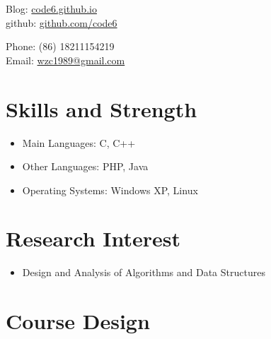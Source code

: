 \documentclass[margin,line]{res}
\newcommand{\ressection}[1]{
    {\colorbox{bg}{\fontfamily{phv}\selectfont\large#1}}
}
\begin{document}


\begin{resume}

 \hspace{-1cm}
\begin{minipage}{1\linewidth}
  \begin{minipage}{0.49\linewidth}
    Blog:   \href{http://code6.github.com}{code6.github.io}\\
    github: \href{http://github.com/code6}{github.com/code6} \\
  \end{minipage}
  \hspace{\fill}
  \begin{minipage}{0.49\linewidth}
    {\Large{}}Phone: (86) 18211154219 \\
    {\Large{}}Email: \href{mailto:wzc1989@gmail.com}{wzc1989@gmail.com} \\
  \end{minipage}
\end{minipage}

\section{\ressection{Skills and Strength}}
\vspace{1cm}
\begin{itemize}
            \item[\ding {72}] Main Languages: C, C++
            \item[\ding {72}] Other Languages: PHP, Java
            \item[\ding {72}] Operating Systems: Windows XP, Linux
\end{itemize}

 

\section{\ressection{Research Interest}}
\vspace{1cm}
\begin{itemize}
\item[\ding {52}] Design and Analysis of Algorithms and  Data Structures
\end{itemize}

\section{\ressection{Course Design}}
\vspace{1cm}

\end{resume}
\end{document}
